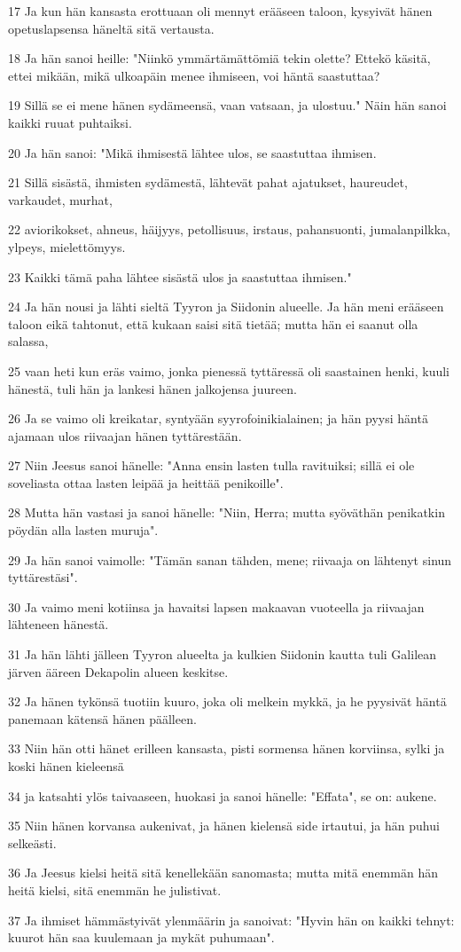 \par 17 Ja kun hän kansasta erottuaan oli mennyt erääseen taloon, kysyivät hänen opetuslapsensa häneltä sitä vertausta.
\par 18 Ja hän sanoi heille: "Niinkö ymmärtämättömiä tekin olette? Ettekö käsitä, ettei mikään, mikä ulkoapäin menee ihmiseen, voi häntä saastuttaa?
\par 19 Sillä se ei mene hänen sydämeensä, vaan vatsaan, ja ulostuu." Näin hän sanoi kaikki ruuat puhtaiksi.
\par 20 Ja hän sanoi: "Mikä ihmisestä lähtee ulos, se saastuttaa ihmisen.
\par 21 Sillä sisästä, ihmisten sydämestä, lähtevät pahat ajatukset, haureudet, varkaudet, murhat,
\par 22 aviorikokset, ahneus, häijyys, petollisuus, irstaus, pahansuonti, jumalanpilkka, ylpeys, mielettömyys.
\par 23 Kaikki tämä paha lähtee sisästä ulos ja saastuttaa ihmisen."
\par 24 Ja hän nousi ja lähti sieltä Tyyron ja Siidonin alueelle. Ja hän meni erääseen taloon eikä tahtonut, että kukaan saisi sitä tietää; mutta hän ei saanut olla salassa,
\par 25 vaan heti kun eräs vaimo, jonka pienessä tyttäressä oli saastainen henki, kuuli hänestä, tuli hän ja lankesi hänen jalkojensa juureen.
\par 26 Ja se vaimo oli kreikatar, syntyään syyrofoinikialainen; ja hän pyysi häntä ajamaan ulos riivaajan hänen tyttärestään.
\par 27 Niin Jeesus sanoi hänelle: "Anna ensin lasten tulla ravituiksi; sillä ei ole soveliasta ottaa lasten leipää ja heittää penikoille".
\par 28 Mutta hän vastasi ja sanoi hänelle: "Niin, Herra; mutta syöväthän penikatkin pöydän alla lasten muruja".
\par 29 Ja hän sanoi vaimolle: "Tämän sanan tähden, mene; riivaaja on lähtenyt sinun tyttärestäsi".
\par 30 Ja vaimo meni kotiinsa ja havaitsi lapsen makaavan vuoteella ja riivaajan lähteneen hänestä.
\par 31 Ja hän lähti jälleen Tyyron alueelta ja kulkien Siidonin kautta tuli Galilean järven ääreen Dekapolin alueen keskitse.
\par 32 Ja hänen tykönsä tuotiin kuuro, joka oli melkein mykkä, ja he pyysivät häntä panemaan kätensä hänen päälleen.
\par 33 Niin hän otti hänet erilleen kansasta, pisti sormensa hänen korviinsa, sylki ja koski hänen kieleensä
\par 34 ja katsahti ylös taivaaseen, huokasi ja sanoi hänelle: "Effata", se on: aukene.
\par 35 Niin hänen korvansa aukenivat, ja hänen kielensä side irtautui, ja hän puhui selkeästi.
\par 36 Ja Jeesus kielsi heitä sitä kenellekään sanomasta; mutta mitä enemmän hän heitä kielsi, sitä enemmän he julistivat.
\par 37 Ja ihmiset hämmästyivät ylenmäärin ja sanoivat: "Hyvin hän on kaikki tehnyt: kuurot hän saa kuulemaan ja mykät puhumaan".

